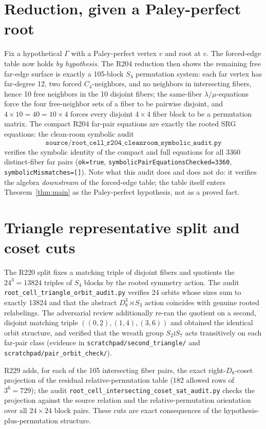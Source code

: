 \documentclass[11pt]{article}
\begin{document}
\section{Reduction, given a Paley-perfect root}

Fix a hypothetical \(\Gamma\) with a Paley-perfect vertex \(v\) and root at
\(v\).  The forced-edge table now holds \emph{by hypothesis}.  The R204
reduction then shows the remaining free far-edge surface is exactly a
105-block \(S_4\) permutation system: each far vertex has far-degree 12, two
forced \(C_4\)-neighbors, and no neighbors in intersecting fibers, hence 10
free neighbors in the 10 disjoint fibers; the same-fiber
\(\lambda/\mu\)-equations force the four free-neighbor sets of a fiber to be
pairwise disjoint, and \(4\times 10 = 40 = 10\times 4\) forces every disjoint
\(4\times4\) fiber block to be a permutation matrix.  The compact R204
far-pair equations are exactly the rooted SRG equations: the clean-room
symbolic audit
\[
\texttt{source/root\_cell\_r204\_cleanroom\_symbolic\_audit.py}
\]
verifies the symbolic identity of the compact and full equations for all 3360
distinct-fiber far pairs (\texttt{ok=true},
\texttt{symbolicPairEquationsChecked=3360}, \texttt{symbolicMismatches=[]}).
Note what this audit does and does not do: it verifies the algebra
\emph{downstream} of the forced-edge table; the table itself enters
Theorem~\ref{thm:main} as the Paley-perfect hypothesis, not as a proved fact.

\section{Triangle representative split and coset cuts}

The R220 split fixes a matching triple of disjoint fibers and quotients the
\(24^3=13824\) triples of \(S_4\) blocks by the rooted symmetry action.  The
audit \texttt{root\_cell\_triangle\_orbit\_audit.py} verifies 24 orbits whose
sizes sum to exactly 13824 and that the abstract
\(D_8^3\rtimes S_3\) action coincides with genuine rooted relabelings.  The
adversarial review additionally re-ran the quotient on a second, disjoint
matching triple \(((0,2),(1,4),(3,6))\) and obtained the identical orbit
structure, and verified that the wreath group \(S_2\wr S_7\) acts transitively
on each far-pair class (evidence in
\texttt{scratchpad/second\_triangle/} and
\texttt{scratchpad/pair\_orbit\_check/}).

R229 adds, for each of the 105 intersecting fiber pairs, the exact
right-\(D_8\)-coset projection of the residual relative-permutation table (182
allowed rows of \(3^6=729\)); the audit
\texttt{root\_cell\_intersecting\_coset\_sat\_audit.py} checks the projection
against the source relation and the relative-permutation orientation over all
\(24\times24\) block pairs.  These cuts are exact consequences of the
hypothesis-plus-permutation structure.
\end{document}
